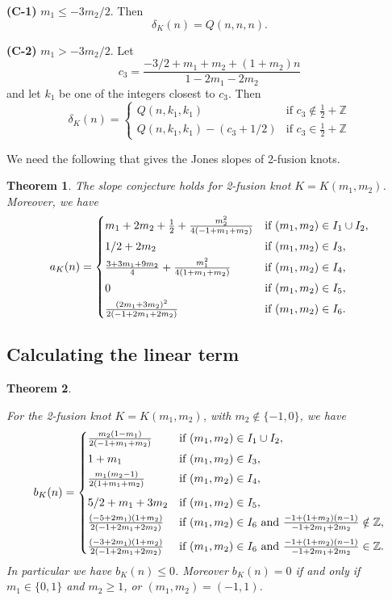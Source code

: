 \documentclass[11pt]{amsart}
\numberwithin{equation}{section}
\theoremstyle{plain}
\newtheorem{theorem}{Theorem}[section]
\theoremstyle{definition}
\def\BZ{\mathbb Z}
\begin{document}
\textbf{(C-1)} $m_1 \le -3m_2/2$. Then 
$$\delta_K(n) = Q(n,n,n).$$

\textbf{(C-2)} $m_1 > -3m_2/2$. Let $$c_3=\frac{-3/2 + m_1 + m_2 + (1+m_2 ) n}{1-2m_1-2m_2}$$
and let $k_1$ be one of the integers closest to $c_3$. Then
$$\delta_K(n) = \begin{cases} Q(n,k_1,k_1) &\mbox{if } c_3 \notin \frac{1}{2} + \BZ \\ 
Q(n,k_1,k_1)-(c_3 + 1/2) & \mbox{if } c_3 \in \frac{1}{2} + \BZ \end{cases}$$

We need the following that gives the Jones slopes of 2-fusion knots.

\begin{theorem} \label{a_K}
\cite{DG, GV}
The slope conjecture holds for 2-fusion knot $K=K(m_1,m_2)$. Moreover, we have
$$
 a_K(n) = \begin{cases} m_1 + 2m_2 + \frac{1}{2} + \frac{m_2^2}{4(-1 + m_1 + m_2)} &\mbox{if } (m_1, m_2) \in I_1 \cup I_2, 
\smallskip
\\ 1/2 + 2 m_2   & \mbox{if } (m_1, m_2) \in I_3, 
\smallskip
\\ \frac{3 + 3m_1 + 9m_2}{4} +  \frac{m_1^2}{4(1 + m_1 + m_2)} & \mbox{if } (m_1, m_2) \in I_4, 
\smallskip
\\ 0  & \mbox{if } (m_1, m_2) \in I_5, 
\smallskip
\\ \frac {(2 m_1 + 3 m_2)^2} {2 (-1 + 2 m_1 + 2 m_2)} & \mbox{if } (m_1, m_2) \in I_6.
\end{cases}
$$
\end{theorem}

\subsection{Calculating the linear term}  

\begin{theorem}

\label{prop:b}

For the 2-fusion knot $K=K(m_1,m_2)$, with $m_2 \notin \{-1,0\}$, we have
$$
b_K(n) = \begin{cases} \frac{m_2(1-m_1)}{2(-1+m_1+m_2)} &\mbox{if } (m_1, m_2) \in I_1 \cup I_2, 
\smallskip
\\ 1 + m_1  & \mbox{if } (m_1, m_2) \in I_3, 
\smallskip
\\ \frac{m_1(m_2-1)}{2(1+m_1+m_2)}   & \mbox{if } (m_1, m_2) \in I_4, 
\medskip
\\ 5/2 + m_1 + 3 m_2  & \mbox{if } (m_1, m_2) \in I_5, 
\smallskip
\\ \frac {(-5 + 2m_1)(1 + m_2)} {2 (-1 + 2 m_1 + 2 m_2)} & \mbox{if } (m_1, m_2) \in I_6 \mbox{ and } \frac {-1+(1 + m_2)(n-1)} {-1 + 2 m_1 + 2 m_2} \notin  \BZ,
\medskip
\\ \frac {(-3 + 2m_1)(1 + m_2)} {2 (-1 + 2 m_1 + 2 m_2)} & \mbox{if } (m_1, m_2) \in I_6\mbox{ and } \frac {-1+(1 + m_2)(n-1)} {-1 + 2 m_1 + 2 m_2} \in  \BZ.
\end{cases}
$$
In particular we have $b_K(n) \le 0$. Moreover $b_K(n) = 0$ if and only if $m_1 \in \{0,1\}$ and $m_2 \ge 1$, or $(m_1, m_2) = (-1,1)$.
\end{theorem}
\end{document}
